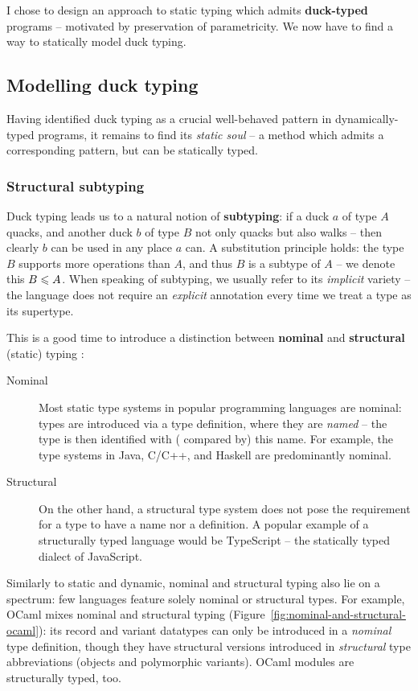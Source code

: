 I chose to design an approach to static typing which admits \textbf{duck-typed} programs -- motivated by preservation of parametricity. 
We now have to find a way to statically model duck typing.

\subsection{Modelling duck typing}
\label{subsec:duck-models}

Having identified duck typing as a crucial well-behaved pattern in dynamically-typed programs, it remains to find its \emph{static soul} -- a method which admits a corresponding pattern, but can be statically typed.

\subsubsection{Structural subtyping}

Duck typing leads us to a natural notion of \textbf{subtyping}: if a duck $a$ of type $A$ quacks, and another duck $b$ of type $B$ not only quacks but also walks -- then clearly $b$ can be used in any place $a$ can. A substitution principle holds: the type $B$ supports more operations than $A$, and thus $B$ is a subtype of $A$ \cite{tapl} -- we denote this $B \leqslant A$. When speaking of subtyping, we usually refer to its \emph{implicit} variety -- the language does not require an \emph{explicit} annotation every time we treat a type as its supertype.

\needspace{1em}
This is a good time to introduce a distinction between \textbf{nominal} and \textbf{structural} (static) typing \cite{tapl}: \begin{description}
    \item[Nominal] Most static type systems in popular programming languages are nominal: types are introduced via a type definition, where they are \emph{named} -- the type is then identified with (\eg{} compared by) this name. For example, the type systems in Java, C/C++, and Haskell are predominantly nominal.
    \item[Structural] On the other hand, a structural type system does not pose the requirement for a type to have a name nor a definition. A popular example of a structurally typed language would be TypeScript -- the statically typed dialect of JavaScript. 
\end{description}
Similarly to static and dynamic, nominal and structural typing also lie on a spectrum: few languages feature solely nominal or structural types. For example, OCaml mixes nominal and structural typing (Figure~\ref{fig:nominal-and-structural-ocaml}): its record and variant datatypes can only be introduced in a \emph{nominal} type definition, though they have structural versions introduced in \emph{structural} type abbreviations (objects and polymorphic variants). OCaml modules are structurally typed, too.

